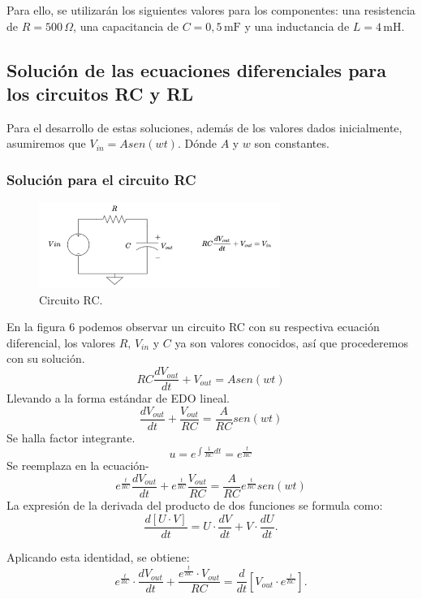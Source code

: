\documentclass{article}
\begin{document}
Para ello, se utilizarán los siguientes valores para los componentes: una resistencia de \( R = 500\,\Omega \), una capacitancia de \( C = 0{,}5\,\text{mF} \) y una inductancia de \( L = 4\,\text{mH} \).
\subsection{Solución de las ecuaciones diferenciales para los circuitos RC y RL}
Para el desarrollo de estas soluciones, además de los valores dados inicialmente, asumiremos que \(V_{in}=Asen(wt)\). Dónde \(A\) y \(w\) son constantes.
\subsubsection{Solución para el circuito RC}
\begin{figure}[H]
    \centering
    \includegraphics[width=0.7\textwidth]{CirtoRC.png}
    \caption{Circuito RC.}
    \label{fig:CirctoRC}
\end{figure}
En la figura 6 podemos observar un circuito RC con su respectiva ecuación diferencial, los valores \(R,\,V_{in}\) y \(C\) ya son valores conocidos, así que procederemos con su solución.
\[
    RC\frac{dV_{out}}{dt}+V_{out}=Asen(wt)
\]
Llevando a la forma estándar de EDO lineal.
\[
    \frac{dV_{out}}{dt}+\frac{V_{out}}{RC}=\frac{A}{RC}sen(wt)
\]
Se halla factor integrante.
\[
    u=e^{\int \frac{1}{RC}dt}=e^{\frac{t}{RC}} 
\]
Se reemplaza en la ecuación-
\[
    e^{\frac{t}{RC}}\frac{dV_{out}}{dt}+e^{\frac{t}{RC}}\frac{V_{out}}{RC}=\frac{A}{RC}e^{\frac{t}{RC}}sen(wt)
\]
La expresión de la derivada del producto de dos funciones se formula como:
\begin{equation*}
    \frac{d[U \cdot V]}{dt} = U \cdot \frac{dV}{dt} + V \cdot \frac{dU}{dt}.
\end{equation*}

Aplicando esta identidad, se obtiene:
\begin{equation*}
    e^{\frac{t}{RC}} \cdot \frac{dV_{out}}{dt} + \frac{e^{\frac{t}{RC}} \cdot V_{out}}{RC} = \frac{d}{dt}\left[V_{out} \cdot e^{\frac{t}{RC}}\right].
\end{equation*}
\end{document}
